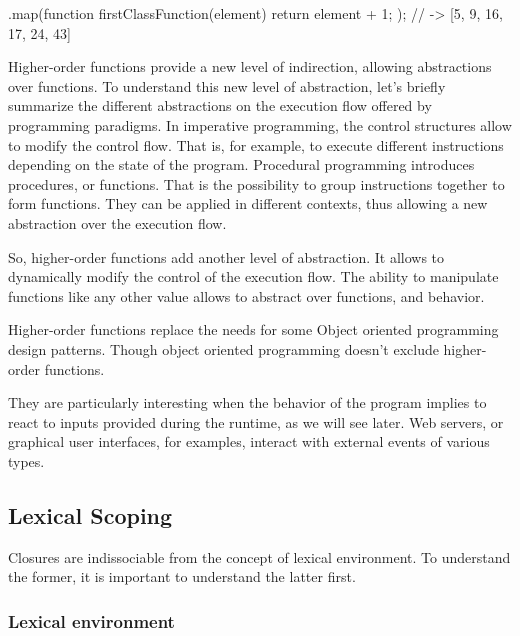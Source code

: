 \begin{code}
  [4, 8, 15, 16, 23, 42].map(function firstClassFunction(element) {
    return element + 1;
  });
  // -> [5, 9, 16, 17, 24, 43]
\end{code}

Higher-order functions provide a new level of indirection, allowing abstractions over functions.
To understand this new level of abstraction, let's briefly summarize the different abstractions on the execution flow offered by programming paradigms.
In imperative programming, the control structures allow to modify the control flow. That is, for example, to execute different instructions depending on the state of the program.
Procedural programming introduces procedures, or functions. That is the possibility to group instructions together to form functions.
They can be applied in different contexts, thus allowing a new abstraction over the execution flow.

So, higher-order functions add another level of abstraction.
It allows to dynamically modify the control of the execution flow.
The ability to manipulate functions like any other value allows to abstract over functions, and behavior.

Higher-order functions replace the needs for some Object oriented programming design patterns. Though object oriented programming doesn't exclude higher-order functions.

They are particularly interesting when the behavior of the program implies to react to inputs provided during the runtime, as we will see later.
Web servers, or graphical user interfaces, for examples, interact with external events of various types.


\subsection{Lexical Scoping}

Closures are indissociable from the concept of lexical environment.
To understand the former, it is important to understand the latter first.

\subsubsection{Lexical environment}

